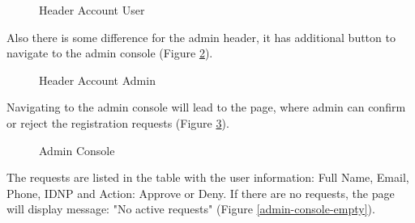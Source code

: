 \begin{figure}[H]
    \centering
    \caption{Header Account User}
    \label{header-account-user}
\end{figure}

Also there is some difference for the admin header, it has additional button to navigate to the admin console (Figure \ref{header-account-admin}).

\begin{figure}[H]
    \centering
    \caption{Header Account Admin}
    \label{header-account-admin}
\end{figure}

Navigating to the admin console will lead to the page, where admin can confirm or reject the registration requests (Figure \ref{admin-console}). 

\begin{figure}[H]
    \centering
    \caption{Admin Console}
    \label{admin-console}
\end{figure}

The requests are listed in the table with the user information: Full Name, Email, Phone, IDNP and Action: Approve or Deny. If there are no requests, the page will display message: "No active requests" (Figure \ref{admin-console-empty}).

